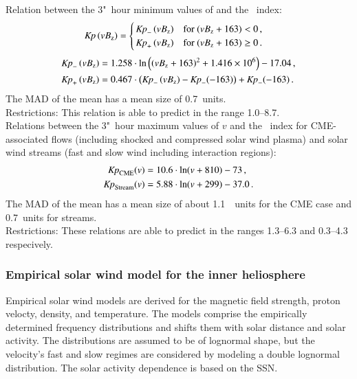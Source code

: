 Relation between the 3"~hour minimum values of \vBz{} and the \Kp~index:
\begin{align*}
	\text{\textit{Kp}}\left(vB_\text{z}\right) &=
	\begin{cases}
		\,\text{\textit{Kp}}_-\left(vB_\text{z}\right) &\text{for } (vB_\text{z} + 163) < 0	\,,\\
		\,\text{\textit{Kp}}_+\left(vB_\text{z}\right) &\text{for } (vB_\text{z} + 163) \ge 0	\,.
	\end{cases}
\end{align*}
\begin{align*}
	\text{\textit{Kp}}_-\left(vB_\text{z}\right) &= 1.258 \cdot \ln\left(\left(vB_\text{z} + 163\right)^2 + \num{1.416e6}\right) - 17.04	\,,\\
	\text{\textit{Kp}}_+\left(vB_\text{z}\right) &= 0.467 \cdot \left(\text{\textit{Kp}}_-\left(vB_\text{z}\right) - \text{\textit{Kp}}_-(-163)\right) + \text{\textit{Kp}}_-(-163)	\,.
\end{align*}
The MAD of the mean has a mean size of \SI{0.7}{\Kp}~units.\\
Restrictions: This relation is able to predict \Kp{} in the range \numrange{1.0}{8.7}.\\

Relations between the 3"~hour maximum values of $v$ and the \Kp~index for CME-associated flows (including shocked and compressed solar wind plasma) and solar wind streams (fast and slow wind including interaction regions):
\begin{align*}
	\text{\textit{Kp}}_\text{CME}(v) &= 10.6 \cdot \ln(v + 810) - 73	\,,\\
	\text{\textit{Kp}}_\text{Stream}(v) &= 5.88 \cdot \ln(v + 299) - 37.0	\,.
\end{align*}
The MAD of the mean has a mean size of about \SI{1.1}{\Kp~units} for the CME case and \SI{0.7}{\Kp}~units for streams.\\
Restrictions: These relations are able to predict \Kp{} in the ranges \numrange{1.3}{6.3} and \numrange{0.3}{4.3} respecively.\\


\subsubsection*{Empirical solar wind model for the inner heliosphere}

Empirical solar wind models are derived for the magnetic field strength, proton velocty, density, and temperature. The models comprise the empirically determined frequency distributions and shifts them with solar distance and solar activity. The distributions are assumed to be of lognormal shape, but the velocity's fast and slow regimes are considered by modeling a double lognormal distribution. The solar activity dependence is based on the SSN.\\

